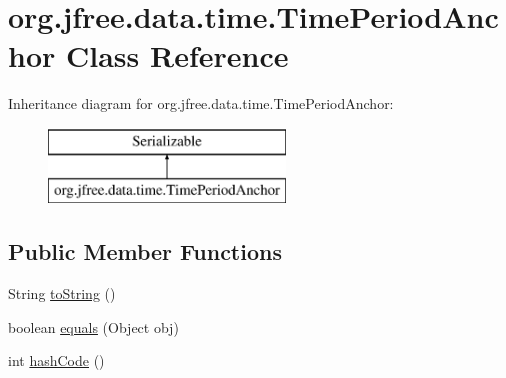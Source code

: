 \hypertarget{classorg_1_1jfree_1_1data_1_1time_1_1_time_period_anchor}{}\section{org.\+jfree.\+data.\+time.\+Time\+Period\+Anchor Class Reference}
\label{classorg_1_1jfree_1_1data_1_1time_1_1_time_period_anchor}
Inheritance diagram for org.\+jfree.\+data.\+time.\+Time\+Period\+Anchor\+:\begin{figure}[H]
\begin{center}
\leavevmode
\includegraphics[height=2.000000cm]{classorg_1_1jfree_1_1data_1_1time_1_1_time_period_anchor}
\end{center}
\end{figure}
\subsection*{Public Member Functions}
\begin{DoxyCompactItemize}
\item 
String \mbox{\hyperlink{classorg_1_1jfree_1_1data_1_1time_1_1_time_period_anchor_a2185574b741ff96d150f37290a37e05b}{to\+String}} ()
\item 
boolean \mbox{\hyperlink{classorg_1_1jfree_1_1data_1_1time_1_1_time_period_anchor_a64e5702054da8e2e0172e7807e56923a}{equals}} (Object obj)
\item 
int \mbox{\hyperlink{classorg_1_1jfree_1_1data_1_1time_1_1_time_period_anchor_ad0cd653c1193450a98df8e7d54d3d2a0}{hash\+Code}} ()
\end{DoxyCompactItemize}
